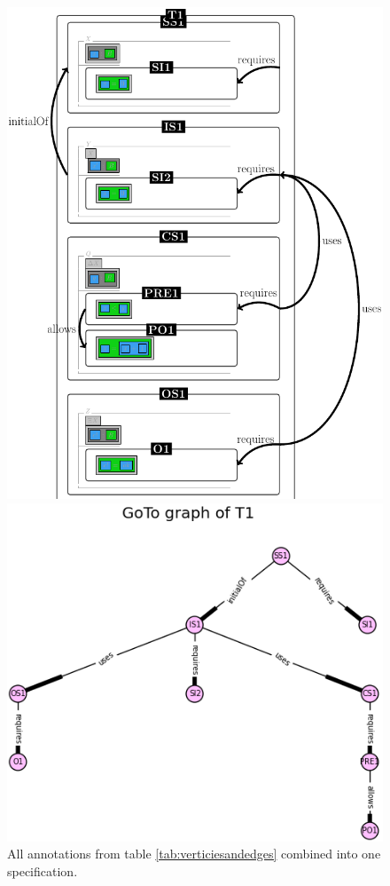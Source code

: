 \begin{figure}[H]
\centering
\begin{minipage}{0.45\textwidth}
\centering
\includegraphics[scale=0.3]{Figures/Formalising/draspec.png}
\caption{All annotations from table \ref{tab:verticiesandedges} combined into one specification.  \label{fig:draspeca}}
\end{minipage}\hfill
\begin{minipage}{0.45\textwidth}
\centering
\includegraphics[scale=0.6]{Figures/Formalising/goto_text.png}

\end{minipage}
\end{figure}
